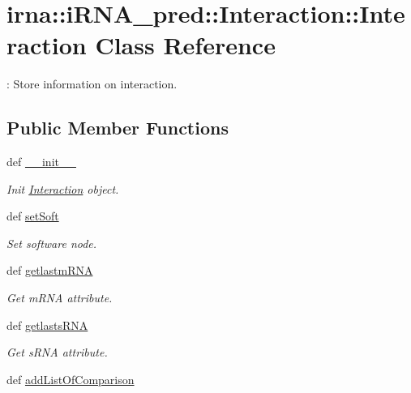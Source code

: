 \hypertarget{classirna_1_1iRNA__pred_1_1Interaction_1_1Interaction}{
\section{irna\-:\-:i\-R\-N\-A\-\_\-pred\-:\-:\-Interaction\-:\-:\-Interaction \-Class \-Reference}
\label{classirna_1_1iRNA__pred_1_1Interaction_1_1Interaction}
}


\-: \-Store information on interaction.  


\subsection*{\-Public \-Member \-Functions}
\begin{DoxyCompactItemize}
\item 
def \hyperlink{classirna_1_1iRNA__pred_1_1Interaction_1_1Interaction_a6828656db5fadd02397a8f00b6f44958}{\-\_\-\-\_\-init\-\_\-\-\_\-}
\begin{DoxyCompactList}\small\item\em \-Init \hyperlink{classirna_1_1iRNA__pred_1_1Interaction_1_1Interaction}{\-Interaction} object. \end{DoxyCompactList}\item 
def \hyperlink{classirna_1_1iRNA__pred_1_1Interaction_1_1Interaction_aef4ad03c78064e16751cb046496e5253}{set\-Soft}
\begin{DoxyCompactList}\small\item\em \-Set software node. \end{DoxyCompactList}\item 
def \hyperlink{classirna_1_1iRNA__pred_1_1Interaction_1_1Interaction_af43ffab58fe60538c4d9d37bd601516b}{getlastm\-R\-N\-A}
\begin{DoxyCompactList}\small\item\em \-Get m\-R\-N\-A attribute. \end{DoxyCompactList}\item 
def \hyperlink{classirna_1_1iRNA__pred_1_1Interaction_1_1Interaction_a5061f7f2a9999b25bc3f3385b8a70d23}{getlasts\-R\-N\-A}
\begin{DoxyCompactList}\small\item\em \-Get s\-R\-N\-A attribute. \end{DoxyCompactList}\item 
def \hyperlink{classirna_1_1iRNA__pred_1_1Interaction_1_1Interaction_a05605b0a5a2db4e4bad9f9b5fec9f24e}{add\-List\-Of\-Comparison}

\end{DoxyCompactItemize}
